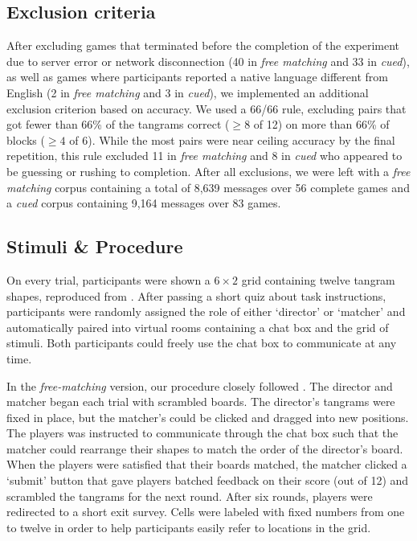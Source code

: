 \documentclass[alpha-refs]{wiley-article}
\begin{document}
\subsection{Exclusion criteria}

After excluding games that terminated before the completion of the experiment due to server error or network disconnection (40 in \emph{free matching} and 33 in \emph{cued}), as well as games where participants reported a native language different from English (2 in \emph{free matching} and 3 in \emph{cued}), we implemented an additional exclusion criterion based on accuracy. 
We used a 66/66 rule, excluding pairs that got fewer than 66\% of the tangrams correct ($\ge8$ of 12) on more than 66\% of blocks ($\ge4$ of 6). 
While the most pairs were near ceiling accuracy by the final repetition, this rule excluded 11 in \emph{free matching} and 8 in \emph{cued} who appeared to be guessing or rushing to completion. 
After all exclusions, we were left with a \emph{free matching} corpus containing a total of 8,639 messages over 56 complete games and a \emph{cued} corpus containing 9,164 messages over 83 games.

\subsection{Stimuli \& Procedure}\label{stimuli}

On every trial, participants were shown a \(6 \times 2\) grid containing twelve tangram shapes, reproduced from \cite{ClarkWilkesGibbs86_ReferringCollaborative}.  
After passing a short quiz about task instructions, participants were randomly assigned the role of either `director' or `matcher' and automatically paired into virtual rooms containing a chat box and the grid of stimuli. 
Both participants could freely use the chat box to communicate at any time. 

In the \emph{free-matching} version, our procedure closely followed \cite{ClarkWilkesGibbs86_ReferringCollaborative}. 
The director and matcher began each trial with scrambled boards. 
The director's tangrams were fixed in place, but the matcher's could be clicked and dragged into new positions.
The players was instructed to communicate through the chat box such that the matcher could rearrange their shapes to match the order of the director's board.
When the players were satisfied that their boards matched, the matcher clicked a `submit' button that gave players batched feedback on their score (out of 12) and scrambled the tangrams for the next round. 
After six rounds, players were redirected to a short exit survey. 
Cells were labeled with fixed numbers from one to twelve in order to help participants easily refer to locations in the grid.
\end{document}
